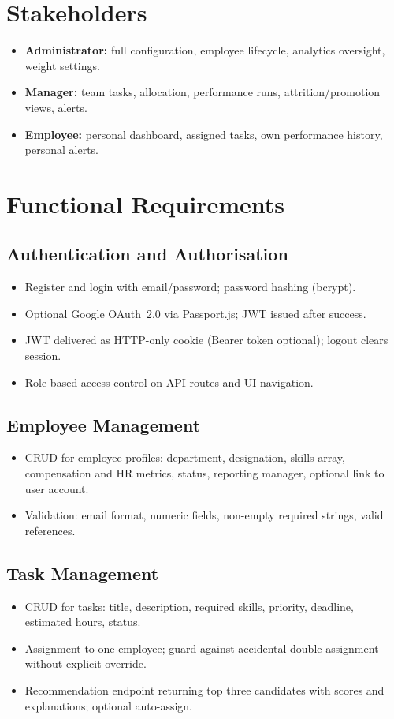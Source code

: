 \section{Stakeholders}
\begin{itemize}
  \item \textbf{Administrator:} full configuration, employee lifecycle, analytics oversight, weight settings.
  \item \textbf{Manager:} team tasks, allocation, performance runs, attrition/promotion views, alerts.
  \item \textbf{Employee:} personal dashboard, assigned tasks, own performance history, personal alerts.
\end{itemize}

\section{Functional Requirements}
\subsection{Authentication and Authorisation}
\begin{itemize}
  \item Register and login with email/password; password hashing (bcrypt).
  \item Optional Google OAuth~2.0 via Passport.js; JWT issued after success.
  \item JWT delivered as HTTP-only cookie (Bearer token optional); logout clears session.
  \item Role-based access control on API routes and UI navigation.
\end{itemize}

\subsection{Employee Management}
\begin{itemize}
  \item CRUD for employee profiles: department, designation, skills array, compensation and HR metrics, status, reporting manager, optional link to user account.
  \item Validation: email format, numeric fields, non-empty required strings, valid references.
\end{itemize}

\subsection{Task Management}
\begin{itemize}
  \item CRUD for tasks: title, description, required skills, priority, deadline, estimated hours, status.
  \item Assignment to one employee; guard against accidental double assignment without explicit override.
  \item Recommendation endpoint returning top three candidates with scores and explanations; optional auto-assign.
\end{itemize}

